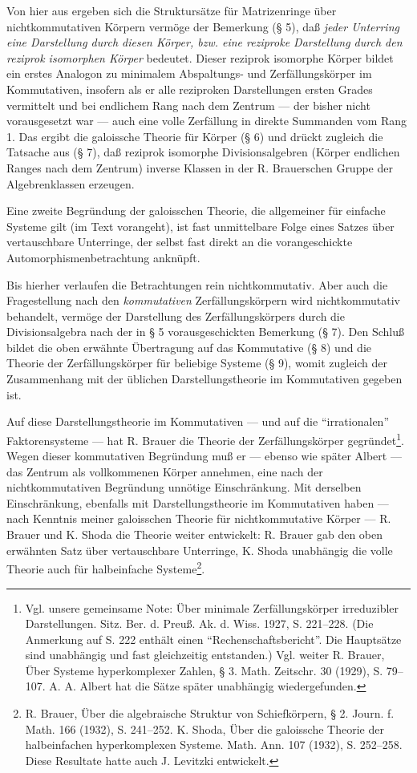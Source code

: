 Von hier aus ergeben sich die Struktursätze für Matrizenringe über nichtkommutativen Körpern vermöge der Bemerkung (§ 5), daß \emph{jeder Unterring eine Darstellung durch diesen Körper, bzw. eine reziproke Darstellung durch den reziprok isomorphen Körper} bedeutet. Dieser reziprok isomorphe Körper bildet ein erstes Analogon zu minimalem Abspaltungs- und Zerfällungskörper im Kommutativen, insofern als er alle reziproken Darstellungen ersten Grades vermittelt und bei endlichem Rang nach dem Zentrum --- der bisher nicht vorausgesetzt war --- auch eine volle Zerfällung in direkte Summanden vom Rang 1. Das ergibt die galoissche Theorie für Körper (§ 6) und drückt zugleich die Tatsache aus (§ 7), daß reziprok isomorphe Divisionsalgebren (Körper endlichen Ranges nach dem Zentrum) inverse Klassen in der R. Brauerschen Gruppe der Algebrenklassen erzeugen.

Eine zweite Begründung der galoisschen Theorie, die allgemeiner für einfache Systeme gilt (im Text vorangeht), ist fast unmittelbare Folge eines Satzes über vertauschbare Unterringe, der selbst fast direkt an die vorangeschickte Automorphismenbetrachtung anknüpft.

Bis hierher verlaufen die Betrachtungen rein nichtkommutativ. Aber auch die Fragestellung nach den \emph{kommutativen} Zerfällungskörpern wird nichtkommutativ behandelt, vermöge der Darstellung des Zerfällungskörpers durch die Divisionsalgebra nach der in § 5 vorausgeschickten Bemerkung (§ 7). Den Schluß bildet die oben erwähnte Übertragung auf das Kommutative (§ 8) und die Theorie der Zerfällungskörper für beliebige Systeme (§ 9), womit zugleich der Zusammenhang mit der üblichen Darstellungstheorie im Kommutativen gegeben ist.

Auf diese Darstellungstheorie im Kommutativen --- und auf die ``irrationalen'' Faktorensysteme --- hat R. Brauer die Theorie der Zerfällungskörper gegründet\footnote{Vgl. unsere gemeinsame Note: Über minimale Zerfällungskörper irreduzibler Darstellungen. Sitz. Ber. d. Preuß. Ak. d. Wiss. 1927, S. 221--228. (Die Anmerkung auf S. 222 enthält einen ``Rechenschaftsbericht''. Die Hauptsätze sind unabhängig und fast gleichzeitig entstanden.) Vgl. weiter R. Brauer, Über Systeme hyperkomplexer Zahlen, § 3. Math. Zeitschr. 30 (1929), S. 79--107. A. A. Albert hat die Sätze später unabhängig wiedergefunden.}. Wegen dieser kommutativen Begründung muß er --- ebenso wie später Albert --- das Zentrum als vollkommenen Körper annehmen, eine nach der nichtkommutativen Begründung unnötige Einschränkung. Mit derselben Einschränkung, ebenfalls mit Darstellungstheorie im Kommutativen haben --- nach Kenntnis meiner galoisschen Theorie für nichtkommutative Körper --- R. Brauer und K. Shoda die Theorie weiter entwickelt: R. Brauer gab den oben erwähnten Satz über vertauschbare Unterringe, K. Shoda unabhängig die volle Theorie auch für halbeinfache Systeme\footnote{R. Brauer, Über die algebraische Struktur von Schiefkörpern, § 2. Journ. f. Math. 166 (1932), S. 241--252. K. Shoda, Über die galoissche Theorie der halbeinfachen hyperkomplexen Systeme. Math. Ann. 107 (1932), S. 252--258. Diese Resultate hatte auch J. Levitzki entwickelt.}.

